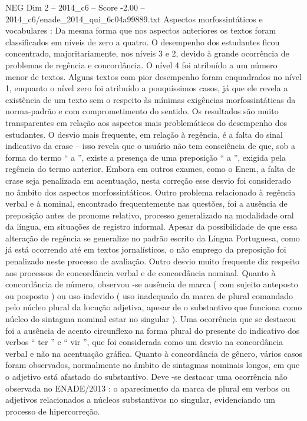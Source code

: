 \begin{textsample}{NEG Dim 2 – 2014\_c6 – Score -2.00 – 2014\_c6/enade\_2014\_qui\_6c04a99889.txt}
Aspectos morfossintáticos e vocabulares : Da mesma forma que nos aspectos anteriores os textos foram classificados em níveis de zero a quatro.
O desempenho dos estudantes ficou concentrado, majoritariamente, nos níveis 3 e 2, devido à grande ocorrência de problemas de regência e concordância.
O nível 4 foi atribuído a um número menor de textos.
Alguns textos com pior desempenho foram enquadrados no nível 1, enquanto o nível zero foi atribuído a pouquíssimos casos, já que ele revela a existência de um texto sem o respeito às mínimas exigências morfossintáticas da norma-padrão e com comprometimento do sentido.
Os resultados são muito transparentes em relação aos aspectos mais problemáticos do desempenho dos estudantes.
O desvio mais frequente, em relação à regência, é a falta do sinal indicativo da crase – isso revela que o usuário não tem consciência de que, sob a forma do termo “ a ”, existe a presença de uma preposição “ a ”, exigida pela regência do termo anterior.
Embora em outros exames, como o Enem, a falta de crase seja penalizada em acentuação, nesta correção esse desvio foi considerado no âmbito dos aspectos morfossintáticos.
Outro problema relacionado à regência verbal e à nominal, encontrado frequentemente nas questões, foi a ausência de preposição antes de pronome relativo, processo generalizado na modalidade oral da língua, em situações de registro informal.
Apesar da possibilidade de que essa alteração de regência se generalize no padrão escrito da Língua Portuguesa, como já está ocorrendo até em textos jornalísticos, o não emprego da preposição foi penalizado neste processo de avaliação.
Outro desvio muito frequente diz respeito aos processos de concordância verbal e de concordância nominal.
Quanto à concordância de número, observou -se ausência de marca ( com sujeito anteposto ou posposto ) ou uso indevido ( uso inadequado da marca de plural comandado pelo núcleo plural da locução adjetiva, apesar de o substantivo que funciona como núcleo do sintagma nominal estar no singular ).
Uma ocorrência que se destacou foi a ausência de acento circunflexo na forma plural do presente do indicativo dos verbos “ ter ” e “ vir ”, que foi considerada como um desvio na concordância verbal e não na acentuação gráfica.
Quanto à concordância de gênero, vários casos foram observados, normalmente no âmbito de sintagmas nominais longos, em que o adjetivo está afastado do substantivo.
Deve -se destacar uma ocorrência não observada no ENADE/2013 : o aparecimento da marca de plural em verbos ou adjetivos relacionados a núcleos substantivos no singular, evidenciando um processo de hipercorreção.

\end{textsample}
